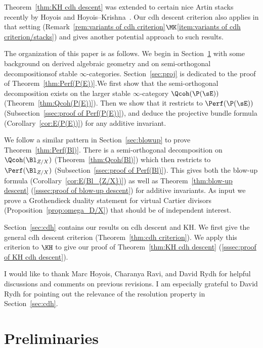 Theorem~\ref{thm:KH cdh descent} was extended to certain nice Artin stacks recently by Hoyois and Hoyois--Krishna~\cite{HoyoisCdh,HoyoisKrishna}. Our cdh descent criterion also applies in that setting (Remark~\ref{rem:variants of cdh criterion}$\MK$\eqref{item:variants of cdh criterion/stacks}) and gives another potential approach to such results.

The organization of this paper is as follows. We begin in Section~\ref{sec:prelim} with some background on derived algebraic geometry and on semi-orthogonal decompositions\linebreak of stable $\infty$-categories.
Section~\ref{sec:proj} is dedicated to the proof of Theorem~\ref{thm:Perf(P(E))}.\linebreak We first show that the semi-orthogonal decomposition exists on the larger stable $\infty$-category $\Qcoh(\P(\sE))$ (Theorem~\ref{thm:Qcoh(P(E))}). Then we show that it restricts to $\Perf(\P(\sE))$ (Subsection~\ref{ssec:proof of Perf(P(E))}), and deduce the projective bundle formula (Corollary~\ref{cor:E(P(E))}) for any additive invariant.

We follow a similar pattern in Section~\ref{sec:blowup} to prove Theorem~\ref{thm:Perf(Bl)}. There is a semi-orthogonal decomposition on $\Qcoh(\Bl_{Z/X})$ (Theorem~\ref{thm:Qcoh(Bl)}) which then restricts to $\Perf(\Bl_{Z/X})$ (Subsection~\ref{ssec:proof of Perf(Bl)}). This gives both the blow-up formula (Corollary~\ref{cor:E(Bl_{Z/X})}) as well as Theorem~\ref{thm:blow-up descent} (\ref{sssec:proof of blow-up descent}) for additive invariants. As input we prove a Grothendieck duality statement for virtual Cartier divisors (Proposition~\ref{prop:omega_D/X}) that should be of independent interest.

Section~\ref{sec:cdh} contains our results on cdh descent and KH. We first give the general cdh descent criterion (Theorem~\ref{thm:cdh criterion}). We apply this criterion to $\KH$ to give our proof of Theorem~\ref{thm:KH cdh descent} (\ref{sssec:proof of KH cdh descent}).

I would like to thank Marc Hoyois, Charanya Ravi, and David Rydh for helpful discussions and comments on previous revisions. I am especially grateful to David Rydh for pointing out the relevance of the resolution property in Section~\ref{sec:cdh}.


\section{Preliminaries}\label{sec:prelim}

